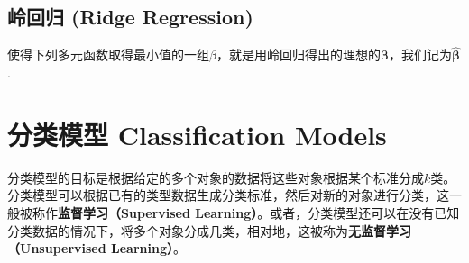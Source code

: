 \documentclass{MGLSA-cn-book-math}
\begin{document}
%
%
%
%
%
%
%

\section{岭回归 (Ridge Regression)}
使得下列多元函数取得最小值的一组$\beta$，就是用岭回归得出的理想的$\bm{\beta}$，我们记为$\hat{\bm\beta}$.
%	
\chapter{分类模型 Classification Models}
分类模型的目标是根据给定的多个对象的数据将这些对象根据某个标准分成$k$类。分类模型可以根据已有的类型数据生成分类标准，然后对新的对象进行分类，这一般被称作\textbf{监督学习（Supervised Learning）}。或者，分类模型还可以在没有已知分类数据的情况下，将多个对象分成几类，相对地，这被称为\textbf{无监督学习（Unsupervised Learning）}。
\end{document}
